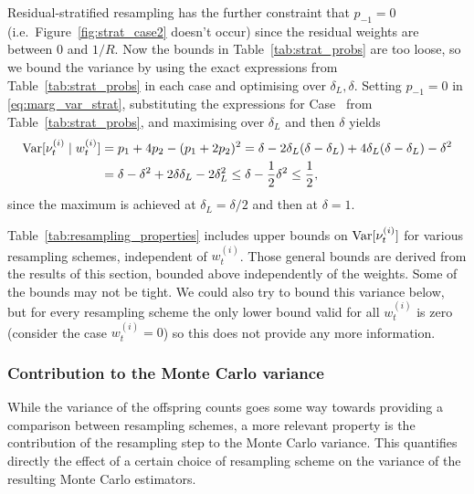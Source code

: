 Residual-stratified resampling has the further constraint that $p_{-1} =0$ (i.e.\ Figure~\ref{fig:strat_case2} doesn't occur) since the residual weights are between $0$ and $1/R$. Now the bounds in Table~\ref{tab:strat_probs} are too loose, so we bound the variance by using the exact expressions from Table~\ref{tab:strat_probs} in each case and optimising over $\delta_L, \delta$.
Setting $p_{-1}=0$ in \eqref{eq:marg_var_strat}, substituting the expressions for Case~ from Table~\ref{tab:strat_probs}, and maximising over $\delta_L$ and then $\delta$ yields
\begin{align*}
\operatorname{Var}[ \nu_t^{(i)} \mid w_t^{(i)} ]
&= p_1 + 4p_2 - (p_1 + 2p_2)^2 
= \delta - 2\delta_L(\delta-\delta_L) + 4\delta_L(\delta-\delta_L) -\delta^2 \\
&= \delta - \delta^2 + 2\delta\delta_L - 2\delta_L^2
\leq \delta - \frac{1}{2}\delta^2
\leq \frac{1}{2} ,
\end{align*}
since the maximum is achieved at $\delta_L = \delta/2$ and then at $\delta=1$.

Table~\ref{tab:resampling_properties} includes upper bounds on $\operatorname{Var}[\nu_t^{(i)}]$ for various resampling schemes, independent of $w_t^{(i)}$. Those general bounds are derived from the results of this section, bounded above independently of the weights. Some of the bounds may not be tight.
We could also try to bound this variance below, but for every resampling scheme the only lower bound valid for all $w_t^{(i)}$ is zero (consider the case $w_t^{(i)}=0$) so this does not provide any more information.





\subsubsection{Contribution to the Monte Carlo variance}
While the variance of the offspring counts goes some way towards providing a comparison between resampling schemes, a more relevant property is the contribution of the resampling step to the Monte Carlo variance.
This quantifies directly the effect of a certain choice of resampling scheme on the variance of the resulting Monte Carlo estimators.

